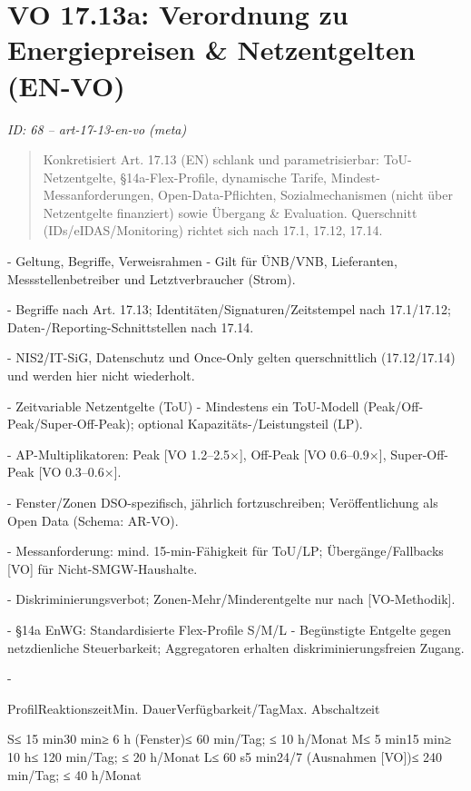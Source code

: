 \documentclass[12pt,a4paper]{scrartcl}
\begin{document}
\section[VO 17.13a: Verordnung zu Energiepreisen \& Netzentgelten (EN-VO)]{VO 17.13a: Verordnung zu Energiepreisen \& Netzentgelten (EN-VO)}
\noindent\textit{ID: 68 -- art-17-13-en-vo (meta)}

\begin{quote}
Konkretisiert Art. 17.13 (EN) schlank und parametrisierbar: ToU-Netzentgelte, §14a-Flex-Profile, dynamische Tarife, Mindest-Messanforderungen, Open-Data-Pflichten, Sozialmechanismen (nicht über Netzentgelte finanziert) sowie Übergang \& Evaluation. Querschnitt (IDs/eIDAS/Monitoring) richtet sich nach 17.1, 17.12, 17.14.
\end{quote}

- Geltung, Begriffe, Verweisrahmen
- Gilt für ÜNB/VNB, Lieferanten, Messstellenbetreiber und Letztverbraucher (Strom).

- Begriffe nach Art. 17.13; Identitäten/Signaturen/Zeitstempel nach 17.1/17.12; Daten-/Reporting-Schnittstellen nach 17.14.

- NIS2/IT-SiG, Datenschutz und Once-Only gelten querschnittlich (17.12/17.14) und werden hier nicht wiederholt.

- Zeitvariable Netzentgelte (ToU)
- Mindestens ein ToU-Modell (Peak/Off-Peak/Super-Off-Peak); optional Kapazitäts-/Leistungsteil (LP).

- AP-Multiplikatoren: Peak [VO 1.2--2.5×], Off-Peak [VO 0.6--0.9×], Super-Off-Peak [VO 0.3--0.6×].

- Fenster/Zonen DSO-spezifisch, jährlich fortzuschreiben; Veröffentlichung als Open Data (Schema: AR-VO).

- Messanforderung: mind. 15-min-Fähigkeit für ToU/LP; Übergänge/Fallbacks [VO] für Nicht-SMGW-Haushalte.

- Diskriminierungsverbot; Zonen-Mehr/Minderentgelte nur nach [VO-Methodik].

- §14a EnWG: Standardisierte Flex-Profile S/M/L
- Begünstigte Entgelte gegen netzdienliche Steuerbarkeit; Aggregatoren erhalten diskriminierungsfreien Zugang.

- 

ProfilReaktionszeitMin. DauerVerfügbarkeit/TagMax. Abschaltzeit

S≤ 15 min30 min≥ 6 h (Fenster)≤ 60 min/Tag; ≤ 10 h/Monat
M≤ 5 min15 min≥ 10 h≤ 120 min/Tag; ≤ 20 h/Monat
L≤ 60 s5 min24/7 (Ausnahmen [VO])≤ 240 min/Tag; ≤ 40 h/Monat
\end{document}
